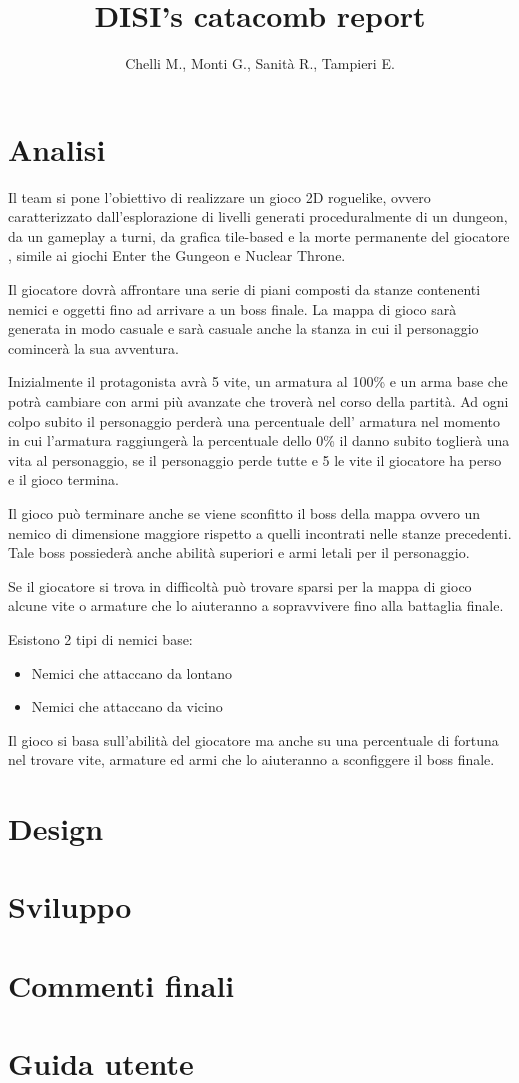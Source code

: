 \documentclass[a4paper]{report}
\title{DISI's catacomb report}
\author{Chelli M., Monti G., Sanità R., Tampieri E.}
\begin{document}
	\maketitle
	\tableofcontents
	\section{Analisi}
	\par Il team si pone l'obiettivo di realizzare un gioco 2D roguelike,
	ovvero caratterizzato dall'esplorazione di livelli generati proceduralmente
	di un dungeon, da un gameplay a turni, da grafica tile-based e la morte
	permanente del giocatore \cite{wiki:Roguelike}, simile ai giochi Enter the
	Gungeon e Nuclear Throne.
	\par Il giocatore dovrà affrontare una serie di piani composti da stanze contenenti nemici e
	oggetti fino ad arrivare a un boss finale. La mappa di gioco sarà generata
	in modo casuale e sarà casuale anche la stanza in cui il personaggio comincerà
	la sua avventura.
	\par Inizialmente il protagonista avrà 5 vite, un armatura al 100\%
	e un arma base che potrà cambiare con armi più avanzate che troverà nel corso
	della partità. Ad ogni colpo subito il personaggio perderà una percentuale dell'
	armatura nel momento in cui l'armatura raggiungerà la percentuale dello 0\%
	il danno subito toglierà una vita al personaggio, se il personaggio perde tutte
	e 5 le vite il giocatore ha perso e il gioco termina.
	\par Il gioco può terminare anche se viene sconfitto il boss della mappa ovvero
	un nemico di dimensione maggiore rispetto a quelli incontrati nelle stanze precedenti.
	Tale boss possiederà anche abilità superiori e armi letali per il personaggio.
	\par Se il giocatore si trova in difficoltà può trovare sparsi per la mappa di gioco
	alcune vite o armature che lo aiuteranno a sopravvivere fino alla battaglia finale.
	\par Esistono 2 tipi di nemici base:
	\begin{itemize}
		\item Nemici che attaccano da lontano
		\item Nemici che attaccano da vicino
	\end{itemize}
	\par Il gioco si basa sull'abilità del giocatore ma anche su una percentuale di
	fortuna nel trovare vite, armature ed armi che lo aiuteranno a sconfiggere il
	boss finale.
	\section{Design}
	\section{Sviluppo}
	\section{Commenti finali}
	\section{Guida utente}
	 
	
\end{document}
